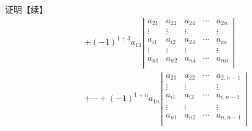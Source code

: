\begin{frame}
  \begin{block}{证明【续】}    
    $$
    \begin{array}{rcl}
      && + (-1)^{1+3} a_{13} \left|
      \begin{array}{ccccc}
        a_{21}  & a_{22} & a_{24}  & \cdots & a_{2n}\\
        \vdots & \vdots & \vdots & & \vdots \\
        a_{i1}  & a_{i2} & a_{24}  & \cdots & a_{in}\\
        \vdots & \vdots & \vdots & & \vdots \\
        a_{n1}  & a_{n2}  & a_{n4} & \cdots & a_{nn}\\
      \end{array}
      \right|\\[0.4in]
      &&
      + \cdots  
      + (-1)^{1+n} a_{1n} \left|
      \begin{array}{cccc}
        a_{21}  & a_{22}   & \cdots & a_{2,n-1}\\
        \vdots  & \vdots & & \vdots \\
        a_{i1}  & a_{i2}   & \cdots & a_{i,n-1}\\
        \vdots & \vdots  & & \vdots \\
        a_{n1}  & a_{n2}   & \cdots & a_{n,n-1}\\
      \end{array}
      \right|
    \end{array}
    $$
  \end{block}
\end{frame}


